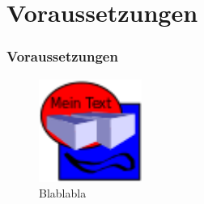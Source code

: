 \section{Voraussetzungen}

\begin{frame}
	\frametitle{Voraussetzungen}	
	\begin{figure}[p]
		\centering
		\includegraphics[width=0.3\textwidth]{figures/fig.png}
		\caption{Blablabla}
		\label{fig:figure}
	\end{figure}
\end{frame}
